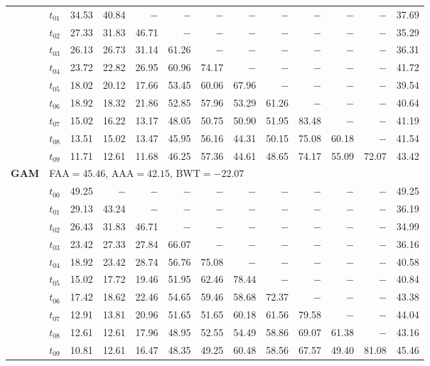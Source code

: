 \begin{table}[ht]
\begin{tabular}{@{}l l r r r r r r r r r r r@{}}
 & $t_{01}$ & 34.53 & 40.84 & $-$ & $-$ & $-$ & $-$ & $-$ & $-$ & $-$ & $-$ & 37.69 \\
 & $t_{02}$ & 27.33 & 31.83 & 46.71 & $-$ & $-$ & $-$ & $-$ & $-$ & $-$ & $-$ & 35.29 \\
 & $t_{03}$ & 26.13 & 26.73 & 31.14 & 61.26 & $-$ & $-$ & $-$ & $-$ & $-$ & $-$ & 36.31 \\
 & $t_{04}$ & 23.72 & 22.82 & 26.95 & 60.96 & 74.17 & $-$ & $-$ & $-$ & $-$ & $-$ & 41.72 \\
 & $t_{05}$ & 18.02 & 20.12 & 17.66 & 53.45 & 60.06 & 67.96 & $-$ & $-$ & $-$ & $-$ & 39.54 \\
 & $t_{06}$ & 18.92 & 18.32 & 21.86 & 52.85 & 57.96 & 53.29 & 61.26 & $-$ & $-$ & $-$ & 40.64 \\
 & $t_{07}$ & 15.02 & 16.22 & 13.17 & 48.05 & 50.75 & 50.90 & 51.95 & 83.48 & $-$ & $-$ & 41.19 \\
 & $t_{08}$ & 13.51 & 15.02 & 13.47 & 45.95 & 56.16 & 44.31 & 50.15 & 75.08 & 60.18 & $-$ & 41.54 \\
 & $t_{09}$ & 11.71 & 12.61 & 11.68 & 46.25 & 57.36 & 44.61 & 48.65 & 74.17 & 55.09 & 72.07 & 43.42 \\
\midrule
\multirow{11}{*}{\textbf{GAM}} & \multicolumn{12}{l}{\quad\small FAA$=45.46$,\; AAA$=42.15$,\; BWT$=-22.07$} \\
 & $t_{00}$ & 49.25 & $-$ & $-$ & $-$ & $-$ & $-$ & $-$ & $-$ & $-$ & $-$ & 49.25 \\
 & $t_{01}$ & 29.13 & 43.24 & $-$ & $-$ & $-$ & $-$ & $-$ & $-$ & $-$ & $-$ & 36.19 \\
 & $t_{02}$ & 26.43 & 31.83 & 46.71 & $-$ & $-$ & $-$ & $-$ & $-$ & $-$ & $-$ & 34.99 \\
 & $t_{03}$ & 23.42 & 27.33 & 27.84 & 66.07 & $-$ & $-$ & $-$ & $-$ & $-$ & $-$ & 36.16 \\
 & $t_{04}$ & 18.92 & 23.42 & 28.74 & 56.76 & 75.08 & $-$ & $-$ & $-$ & $-$ & $-$ & 40.58 \\
 & $t_{05}$ & 15.02 & 17.72 & 19.46 & 51.95 & 62.46 & 78.44 & $-$ & $-$ & $-$ & $-$ & 40.84 \\
 & $t_{06}$ & 17.42 & 18.62 & 22.46 & 54.65 & 59.46 & 58.68 & 72.37 & $-$ & $-$ & $-$ & 43.38 \\
 & $t_{07}$ & 12.91 & 13.81 & 20.96 & 51.65 & 51.65 & 60.18 & 61.56 & 79.58 & $-$ & $-$ & 44.04 \\
 & $t_{08}$ & 12.61 & 12.61 & 17.96 & 48.95 & 52.55 & 54.49 & 58.86 & 69.07 & 61.38 & $-$ & 43.16 \\
 & $t_{09}$ & 10.81 & 12.61 & 16.47 & 48.35 & 49.25 & 60.48 & 58.56 & 67.57 & 49.40 & 81.08 & 45.46 \\

\end{tabular}
\end{table}

